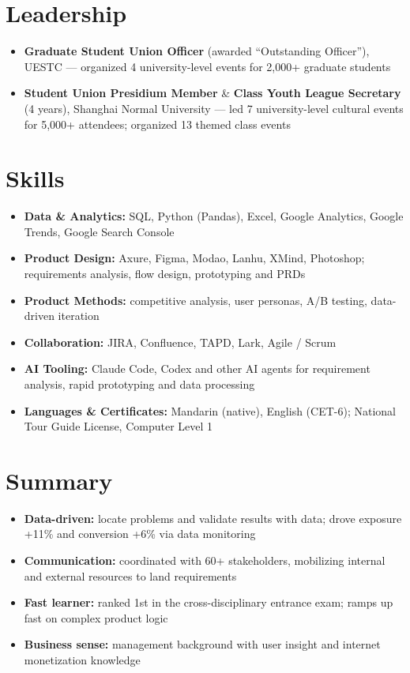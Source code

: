 \documentclass{resume}
\begin{document}
\section{Leadership}

\begin{itemize}
  \item \textbf{Graduate Student Union Officer} (awarded ``Outstanding Officer''), UESTC --- organized 4 university-level events for 2,000+ graduate students
  \item \textbf{Student Union Presidium Member} \& \textbf{Class Youth League Secretary} (4 years), Shanghai Normal University --- led 7 university-level cultural events for 5,000+ attendees; organized 13 themed class events
\end{itemize}

\section{Skills}

\begin{itemize}
  \item \textbf{Data \& Analytics:} SQL, Python (Pandas), Excel, Google Analytics, Google Trends, Google Search Console
  \item \textbf{Product Design:} Axure, Figma, Modao, Lanhu, XMind, Photoshop; requirements analysis, flow design, prototyping and PRDs
  \item \textbf{Product Methods:} competitive analysis, user personas, A/B testing, data-driven iteration
  \item \textbf{Collaboration:} JIRA, Confluence, TAPD, Lark, Agile / Scrum
  \item \textbf{AI Tooling:} Claude Code, Codex and other AI agents for requirement analysis, rapid prototyping and data processing
  \item \textbf{Languages \& Certificates:} Mandarin (native), English (CET-6); National Tour Guide License, Computer Level 1
\end{itemize}

\section{Summary}

\begin{itemize}
  \item \textbf{Data-driven:} locate problems and validate results with data; drove exposure +11\% and conversion +6\% via data monitoring
  \item \textbf{Communication:} coordinated with 60+ stakeholders, mobilizing internal and external resources to land requirements
  \item \textbf{Fast learner:} ranked 1st in the cross-disciplinary entrance exam; ramps up fast on complex product logic
  \item \textbf{Business sense:} management background with user insight and internet monetization knowledge\end{itemize}
\end{document}
